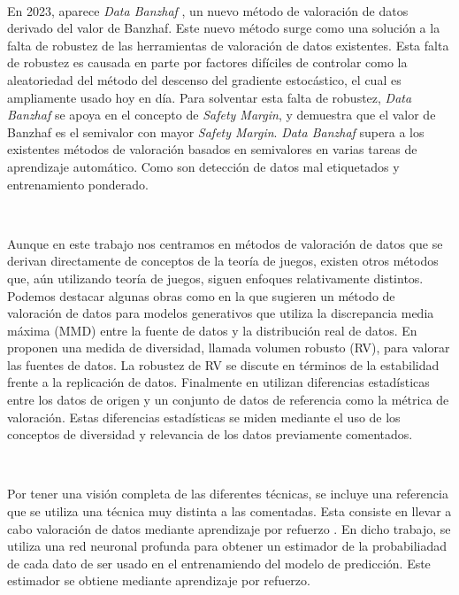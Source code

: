 \

En 2023, aparece \textit{Data Banzhaf} \cite{dataBanzhaf},
un nuevo método de valoración de datos derivado del valor de Banzhaf.
Este nuevo método surge como una solución a la falta de robustez
de las herramientas de valoración de datos existentes. Esta falta de
robustez es causada en parte por factores difíciles de controlar como
la aleatoriedad del método del descenso del gradiente
estocástico, el cual es ampliamente usado hoy en día.
Para solventar esta falta de robustez, \textit{Data Banzhaf} se
apoya en el concepto de \textit{Safety Margin}, y demuestra que el
valor de Banzhaf es el semivalor con mayor \textit{Safety Margin}. 
\textit{Data Banzhaf} supera a los existentes métodos de valoración
basados en semivalores en varias tareas de aprendizaje automático.
Como son detección de datos mal etiquetados y entrenamiento ponderado.

\

Aunque en este trabajo nos centramos en
métodos de valoración de datos que se derivan directamente de
conceptos de la teoría de juegos, existen otros métodos
que, aún utilizando teoría de juegos, siguen enfoques relativamente
distintos. Podemos destacar algunas obras como \cite{tay} en la que
sugieren un método de valoración de datos para modelos
generativos que utiliza la discrepancia media máxima (MMD) entre
la fuente de datos y la distribución real de datos. En \cite{xu}
proponen una medida de diversidad, llamada volumen robusto (RV),
para valorar las fuentes de datos. La robustez de RV se discute
en términos de la estabilidad frente a la replicación de datos.
Finalmente en \cite{amiri} utilizan diferencias estadísticas
entre los datos de origen y un conjunto de datos de referencia
como la métrica de valoración. Estas diferencias estadísticas
se miden mediante el uso de los conceptos de diversidad y
relevancia de los datos previamente comentados.

\

Por tener una visión completa de las diferentes técnicas,
se incluye una referencia que se utiliza una técnica
muy distinta a las comentadas. Esta consiste en llevar a
cabo valoración de datos mediante aprendizaje por refuerzo
\cite{reinforcement}. En dicho trabajo, se utiliza una red
neuronal profunda para obtener un estimador de la probabiliadad
de cada dato de ser usado en el entrenamiendo del modelo
de predicción. Este estimador se obtiene mediante aprendizaje
por refuerzo.